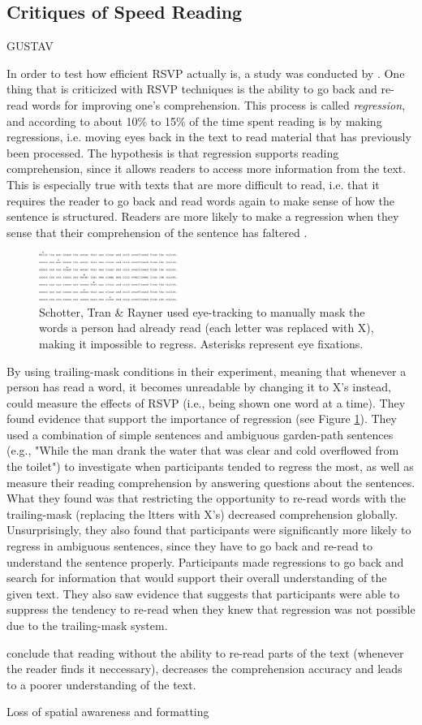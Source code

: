 \subsection{Critiques of Speed Reading}
GUSTAV

In order to test how efficient RSVP actually is, a study was conducted by \cite{schotter_dont_2014}. One thing that is criticized with RSVP techniques is the ability to go back and re-read words for improving one's comprehension. This process is called \textit{regression}, and according to \cite{schotter_dont_2014} about 10\% to 15\% of the time spent reading is by making regressions, i.e. moving eyes back in the text to read material that has previously been processed. The hypothesis is that regression supports reading comprehension, since it allows readers to access more information from the text. This is especially true with texts that are more difficult to read, i.e. that it requires the reader to go back and read words again to make sense of how the sentence is structured. Readers are more likely to make a regression when they sense that their comprehension of the sentence has faltered \cite{schotter_dont_2014}.

\begin{figure}[htbp]
\centering
\includegraphics[width=0.4\textwidth]{Pics/trace_crosses}
\caption{Schotter, Tran \& Rayner used eye-tracking to manually mask the words a person had already read (each letter was replaced with X), making it impossible to regress. Asterisks represent eye fixations.}
\label{fig:trace_cross}
\end{figure}

By using trailing-mask conditions in their experiment, meaning that whenever a person has read a word, it becomes unreadable by changing it to X's instead, \cite{schotter_dont_2014} could measure the effects of RSVP (i.e., being shown one word at a time). They found evidence that support the importance of regression (see Figure \ref{fig:trace_cross}). They used a combination of simple sentences and ambiguous garden-path sentences (e.g., "While
the man drank the water that was clear and cold overflowed from the toilet") to investigate when participants tended to regress the most, as well as measure their reading comprehension by answering questions about the sentences. What they found was that restricting the opportunity to re-read words with the trailing-mask (replacing the ltters with X's) decreased comprehension globally. Unsurprisingly, they also found that participants were significantly more likely to regress in ambiguous sentences, since they have to go back and re-read to understand the sentence properly. Participants made regressions to go back and search for information that would support their overall understanding of the given text. They also saw evidence that suggests that participants were able to suppress the tendency to re-read when they knew that regression was not possible due to the trailing-mask system.

\cite{schotter_dont_2014} conclude that reading without the ability to re-read parts of the text (whenever the reader finds it neccessary), decreases the comprehension accuracy and leads to a poorer understanding of the text.


Loss of spatial awareness and formatting
